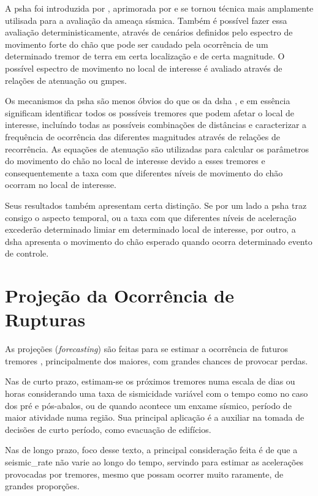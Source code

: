 A \gls{psha} foi introduzida por \citet{cornell_1968}, aprimorada por \citet{mcguire_1976} e se tornou técnica mais amplamente
utilisada para a avaliação da ameaça sísmica. Também é possível fazer essa avaliação deterministicamente, através de
cenários definidos pelo espectro de movimento forte do chão que pode ser caudado pela ocorrência de um
determinado tremor de terra em certa localização e de certa magnitude. O possível espectro de movimento no local de
interesse é avaliado através de relações de atenuação ou \glspl{gmpe}.

Os mecanismos da \gls{psha} \citep{bazzurro_1999, abrahamson_2006} são menos óbvios do que os da \gls{dsha}
\citep{reiter_1991, kramer_1996}, e em essência significam identificar todos os possíveis tremores que podem afetar o local de interesse,
incluíndo todas as possíveis combinações de distâncias e caracterizar a frequência de ocorrência das diferentes magnitudes através de relações de recorrência. As equações de
atenuação são utilizadas para calcular os parâmetros do movimento do chão no local de interesse devido a esses tremores
e consequentemente a taxa com que diferentes níveis de movimento do chão ocorram no local de interesse. 

Seus resultados também apresentam certa distinção. Se por um lado a \gls{psha} traz consigo o aspecto
temporal, ou a taxa com que diferentes níveis de aceleração excederão determinado limiar em determinado local de interesse,
por outro, a \gls{dsha} apresenta o movimento do chão esperado quando ocorra determinado evento de controle.


\section{Projeção da Ocorrência de Rupturas}
\label{sec:projecao}

As projeções (\textit{forecasting}) são feitas para se estimar a ocorrência de futuros tremores 
\citep{kagan_2000,marzocchi_2011}, principalmente dos maiores, com grandes chances de provocar perdas.

Nas de curto prazo, estimam-se os próximos tremores
numa escala de dias ou horas considerando uma taxa de sismicidade variável 
com o tempo como no caso dos pré e pós-abalos, ou de quando 
acontece um enxame sísmico, período de maior atividade numa região.
Sua principal aplicação é a auxiliar na tomada de decisões de curto período, 
como evacuação de edifícios.

Nas de longo prazo, foco desse texto, a principal consideração feita é de que a 
\gls{seismic_rate} não varie ao longo do tempo, servindo para estimar as acelerações 
provocadas por tremores, mesmo que possam ocorrer
muito raramente, de grandes proporções. 

